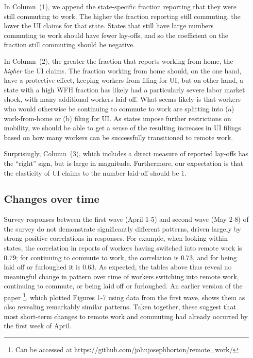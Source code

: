 \documentclass[12pt]{article}
\begin{document}
In Column~(1), we append the state-specific fraction reporting that they were still commuting to work.
The higher the fraction reporting still commuting, the lower the UI claims for that state.
States that still have large numbers commuting to work should have fewer lay-offs, and so the coefficient on the fraction still commuting should be negative.

In Column~(2), the greater the fraction that reports working from home, the \emph{higher} the UI claims.
 The fraction working from home should, on the one hand, have a protective effect, keeping workers from filing for UI, but on other hand, a state with a high WFH fraction has likely had a particularly severe labor market shock, with many additional workers laid-off. 
What seems likely is that workers who would otherwise be continuing to commute to work are splitting into (a) work-from-home or (b) filing for UI.
As states impose further restrictions on mobility, we should be able to get a sense of the resulting increases in UI filings based on how many workers can be successfully transitioned to remote work. 

Surprisingly, Column~(3), which includes a direct measure of reported lay-offs has the ``right'' sign, but is large in magnitude.
Furthermore, our expectation is that the elasticity of UI claims to the number laid-off should be 1. 


\subsection{Changes over time} \label{sec:timechanges}

Survey responses between the first wave (April 1-5) and second wave (May 2-8) of the survey do not demonstrate significantly different patterns, driven largely by strong positive correlations in responses. For example, when looking within states, the correlation in reports of workers having switched into remote work is 0.79; for continuing to commute to work, the correlation is 0.73, and for being laid off or furloughed it is 0.63. As expected, the tables above thus reveal no meaningful change in pattern over time of workers switching into remote work, continuing to commute, or being laid off or furloughed. An earlier version of the paper \footnote{Can be accessed at https://github.com/johnjosephhorton/remote_work/}, which plotted Figures 1-7 using data from the first wave, shows them as also revealing remarkably similar patterns. Taken together, these suggest that most short-term changes to remote work and commuting had already occurred by the first week of April. 
\end{document}
